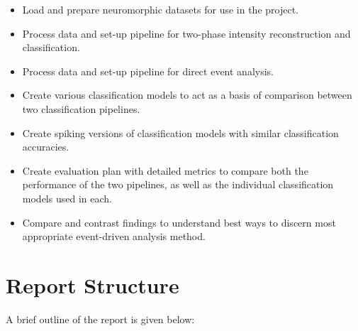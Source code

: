 \begin{itemize}
      \item Load and prepare neuromorphic datasets for use in the project.
      \item Process data and set-up pipeline for two-phase intensity reconstruction and classification.
      \item Process data and set-up pipeline for direct event analysis.
      \item Create various classification models to act as a basis of comparison between two classification pipelines.
      \item Create spiking versions of classification models with similar classification accuracies.
      \item Create evaluation plan with detailed metrics to compare both the performance of the two pipelines, as well as the individual classification models used in each.
      \item Compare and contrast findings to understand best ways to discern most appropriate event-driven analysis method.
\end{itemize}

\section{Report Structure}

A brief outline of the report is given below:

